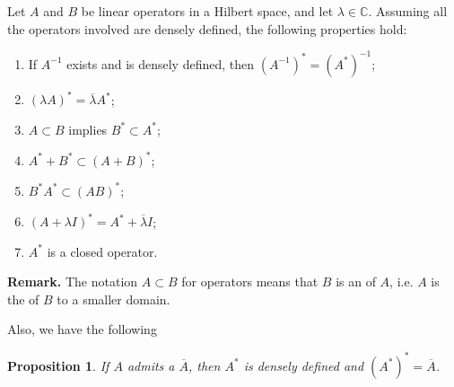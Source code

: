 \documentclass[12pt]{article}
\newtheorem{proposition}{Proposition}
\newcommand{\C}{\mathbb{C}}
\begin{document}
Let $A$ and $B$ be linear operators in a Hilbert space, 
and let $\lambda\in \C$. Assuming all the operators involved are densely defined, the following properties hold:
\begin{enumerate}
\item If $A^{-1}$ exists and is densely defined, then $(A^{-1})^* = (A^*)^{-1}$;
\item $(\lambda A)^* = \overline{\lambda}A^*$;
\item $A\subset B$ implies $B^*\subset A^*$;
\item $A^*+B^*\subset (A+B)^*$;
\item $B^*A^*\subset (AB)^*$;
\item $(A+ \lambda I)^* = A^*+\overline{\lambda}I$;
\item $A^*$ is a closed operator.
\end{enumerate}

\textbf{Remark.} The notation $A\subset B$ for operators means that $B$ is an   of $A$, i.e. $A$ is the 
 of $B$ to a smaller domain.

Also, we have the following

\begin{proposition}
If $A$ admits a  $\overline{A}$, then $A^*$ is densely defined and $(A^*)^* = \overline{A}$.
\end{proposition}
\end{document}

